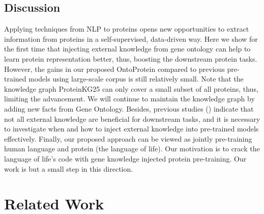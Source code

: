 \subsection{Discussion}
Applying techniques from NLP to proteins opens new opportunities to extract information from proteins in a self-supervised, data-driven way. 
Here we show for the first time that injecting external knowledge from gene ontology can help to learn protein representation better, thus, boosting the downstream protein tasks. 
However, the gains in our proposed OntoProtein compared to previous pre-trained models using large-scale corpus is still relatively small. 
Note that the knowledge graph ProteinKG25 can only cover a small subset of all proteins, thus, limiting the advancement.
We will continue to maintain the knowledge graph by adding new facts from Gene Ontology. 
Besides, previous studies (\cite{DBLP:conf/aaai/LiuZ0WJD020,DBLP:conf/ijcai/ZhangDCCZZC21}) indicate that not all external knowledge are beneficial for downstream tasks, and it is necessary to investigate when and how to inject external knowledge into pre-trained models effectively.
Finally, our proposed approach can be viewed as jointly pre-training human language and protein (the language of life).
Our motivation is to crack the language of life’s code with gene knowledge injected protein pre-training. 
Our work is but a small step in this direction.  

\section{Related Work}

